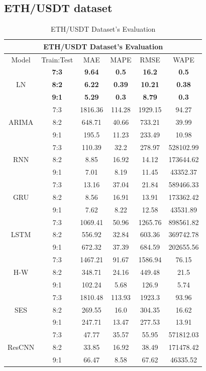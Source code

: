 \documentclass{ieeeojies}
\begin{document}
\subsection{ETH/USDT dataset}
\begin{table}[H]
    \centering
    \begin{tabular}{|c|c|c|c|c|c|}
         \hline
         \multicolumn{6}{|c|}{\textbf{ETH/USDT Dataset's Evaluation}}\\
         \hline
         \centering Model & Train:Test & MAE & MAPE & RMSE & WAPE \\ 
         \hline
         \multirow{3}{*}{LN} & \textbf{7:3} & \textbf{9.64} & \textbf{0.5} & \textbf{16.2} & \textbf{0.5} \\ & \textbf{8:2} & \textbf{6.22} & \textbf{0.39} & \textbf{10.21} & \textbf{0.38} \\ & \textbf{9:1} & \textbf{5.29} & \textbf{0.3} & \textbf{8.79} & \textbf{0.3} \\ 
         \hline
         \multirow{3}{*}{ARIMA} & 7:3 & 1816.36 & 114.28 & 1929.15 & 94.27 \\ & 8:2 & 648.71 & 40.66 & 733.21 & 39.99 \\ & 9:1 & 195.5 & 11.23 & 233.49 & 10.98 \\
         \hline
         \multirow{3}{*}{RNN} & 7:3 & 110.39 & 32.2 & 278.97 & 528102.99 \\ & 8:2 & 8.85 & 16.92 & 14.12 & 173644.62 \\ & 9:1 & 7.01 & 8.19 & 11.45 & 43352.37 \\
         \hline
         \multirow{3}{*}{GRU} & 7:3 & 13.16 & 37.04 & 21.84 & 589466.33 \\ & 8:2 & 8.56 & 16.91 & 13.91 & 173362.42 \\ & 9:1 & 7.62 & 8.22 & 12.58 & 43531.89 \\
         \hline
         \multirow{3}{*}{LSTM} & 7:3 & 1069.41 & 50.96 & 1265.76 & 898561.82 \\ & 8:2 & 556.92 & 32.84 & 603.36 & 369742.78 \\ & 9:1 & 672.32 & 37.39 & 684.59 & 202655.56 \\
         \hline
         \multirow{3}{*}{H-W} & 7:3 & 1467.21 & 91.67 & 1586.94 & 76.15 \\ & 8:2 & 348.71 & 24.16 & 449.48 & 21.5 \\ & 9:1 & 102.24 & 5.68 & 126.9 & 5.74 \\
         \hline
         \multirow{3}{*}{SES} & 7:3 & 1810.48 & 113.93 & 1923.3 & 93.96 \\ & 8:2 & 269.55 & 16.0 & 304.35 & 16.62 \\ & 9:1 & 247.71 & 13.47 & 277.53 & 13.91 \\
         \hline
         \multirow{3}{*}{ResCNN} & 7:3 & 47.77 & 35.57 & 55.95 & 571812.03 \\ & 8:2 & 33.85 & 16.92 & 38.49 & 171478.42 \\ & 9:1 & 66.47 & 8.58 & 67.62 & 46335.52 \\
         \hline
    \end{tabular}
    \caption{ETH/USDT Dataset's Evaluation}
    \label{ethresult}
\end{table}
\end{document}
